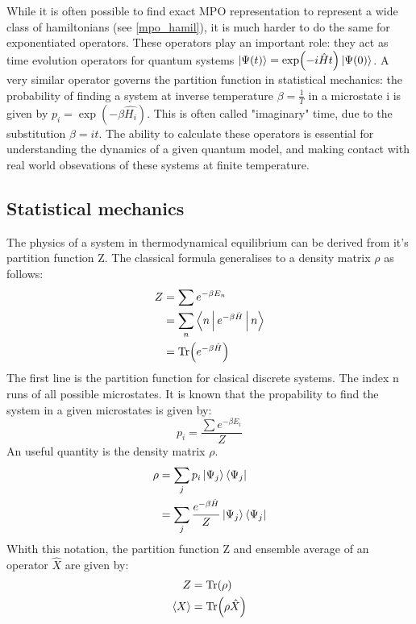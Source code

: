 
While it is often possible to find exact MPO representation to represent a wide class of hamiltonians (see \cref{mpo_hamil}), it is much harder to do the same for exponentiated operators. These operators play an important role: they act as time evolution operators for quantum systems $ \ket{\Psi(t)} = \exp( -i \hat{H} t ) \ket{\Psi(0)}$. A very similar operator governs the partition function in statistical mechanics: the probability of finding a system at inverse temperature $\beta = \frac{1}{T}$ in a microstate i is given by $p_i = \exp(  - \beta \hat{H_i} )$. This is often called "imaginary" time, due to the substitution $\beta = i t$. The ability to calculate these operators is essential for understanding the dynamics of a given quantum model, and making contact with real world obsevations of these systems at finite temperature.

\subsection{Statistical mechanics}\label{subsec:statmech}

The physics of a system in thermodynamical equilibrium can be derived from it's partition function Z. The classical formula generalises to a density matrix $\rho$ as follows:
\begin{equation}
    \begin{split}
        Z &= \sum e^{ - \beta E_n} \\
        &= \sum_n \Braket{n | e^{ - \beta \hat{H} }  | n} \\
        &= \Tr( e^{ - \beta \hat{H} } )
    \end{split}
\end{equation}
The first line is the partition function for clasical discrete systems. The index n runs of all possible microstates. It is known that the propability to find the system in a given microstates is given by:
\begin{equation}
    p_i = \frac{\sum e^{ - \beta E_i}}{Z}
\end{equation}
An useful quantity is the density matrix $\rho$.
\begin{equation}
    \begin{split}
        \rho &= \sum_j p_i  \Ket{ \Psi_j} \Bra{\Psi_j}   \\
        &= \sum_j \frac{ e^{ - \beta \hat{H} } }{Z}  \Ket{ \Psi_j} \Bra{\Psi_j}
    \end{split}
\end{equation}
Whith this notation, the partition function Z and ensemble average of an operator $\hat{X}$ are given by:
\begin{equation}
    \begin{split}
        Z &= \Tr( \rho) \\
        \Braket{X} &= \Tr(\rho \hat{X})
    \end{split}
\end{equation}

